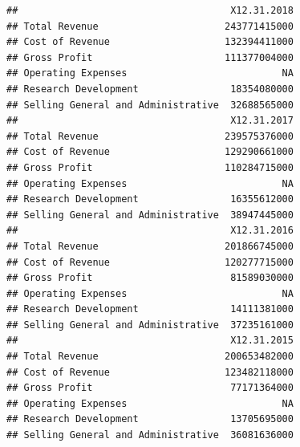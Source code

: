 \documentclass[12pt,]{book}
\newenvironment{Shaded}{\begin{snugshade}}{\end{snugshade}}
\newcommand{\ControlFlowTok}[1]{\textcolor[rgb]{0.13,0.29,0.53}{\textbf{#1}}}
\newcommand{\DataTypeTok}[1]{\textcolor[rgb]{0.13,0.29,0.53}{#1}}
\newcommand{\DecValTok}[1]{\textcolor[rgb]{0.00,0.00,0.81}{#1}}
\newcommand{\KeywordTok}[1]{\textcolor[rgb]{0.13,0.29,0.53}{\textbf{#1}}}
\newcommand{\NormalTok}[1]{#1}
\newcommand{\OperatorTok}[1]{\textcolor[rgb]{0.81,0.36,0.00}{\textbf{#1}}}
\newcommand{\OtherTok}[1]{\textcolor[rgb]{0.56,0.35,0.01}{#1}}
\newcommand{\StringTok}[1]{\textcolor[rgb]{0.31,0.60,0.02}{#1}}
\begin{document}
\begin{Shaded}
\end{Shaded}

\begin{verbatim}
##                                     X12.31.2018
## Total Revenue                      243771415000
## Cost of Revenue                    132394411000
## Gross Profit                       111377004000
## Operating Expenses                           NA
## Research Development                18354080000
## Selling General and Administrative  32688565000
##                                     X12.31.2017
## Total Revenue                      239575376000
## Cost of Revenue                    129290661000
## Gross Profit                       110284715000
## Operating Expenses                           NA
## Research Development                16355612000
## Selling General and Administrative  38947445000
##                                     X12.31.2016
## Total Revenue                      201866745000
## Cost of Revenue                    120277715000
## Gross Profit                        81589030000
## Operating Expenses                           NA
## Research Development                14111381000
## Selling General and Administrative  37235161000
##                                     X12.31.2015
## Total Revenue                      200653482000
## Cost of Revenue                    123482118000
## Gross Profit                        77171364000
## Operating Expenses                           NA
## Research Development                13705695000
## Selling General and Administrative  36081636000
\end{verbatim}
\end{document}
